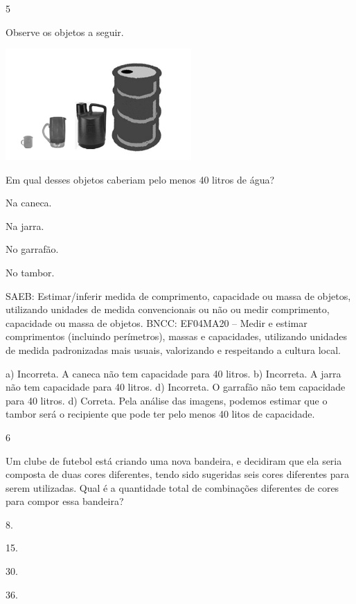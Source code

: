 \begin{mdframed}[linewidth=2pt,linecolor=salmao,roundcorner=2pt]
\begin{escolha}
{\begin{escolha}
\num{5}

Observe os objetos a seguir.

\includegraphics[width=2.78846in,height=1.67526in]{media/image166.png}

Em qual desses objetos caberiam pelo menos 40 litros de água?

\begin{escolha}
\item
  Na caneca.
\item
  Na jarra.
\item
  No garrafão.
\item
  No tambor.
\end{escolha}

SAEB: Estimar/inferir medida de comprimento, capacidade ou
massa de objetos, utilizando unidades de medida convencionais ou não ou
medir comprimento, capacidade ou massa de objetos.
BNCC: EF04MA20 -- Medir e estimar comprimentos (incluindo perímetros), massas e capacidades, utilizando
unidades de medida padronizadas mais usuais, valorizando e respeitando a cultura local.

a) Incorreta. A caneca não tem capacidade para 40 litros.
b) Incorreta. A jarra não tem capacidade para 40 litros.
d) Incorreta. O garrafão não tem capacidade para 40 litros.
d) Correta. Pela análise das imagens, podemos estimar que o tambor será o recipiente que
pode ter pelo menos 40 litos de capacidade.

\num{6}

Um clube de futebol está criando uma nova bandeira, e decidiram que ela seria composta de duas cores diferentes, tendo sido sugeridas seis cores
diferentes para serem utilizadas. Qual é a quantidade total de combinações
diferentes de cores para compor essa bandeira?

\begin{escolha}
\item
  8.
\item
  15.
\item
  30.
\item
  36.
\end{escolha}


\end{escolha}}
\end{escolha}
\end{mdframed}
